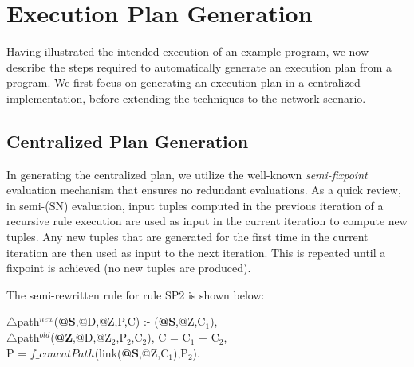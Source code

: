 \section{Execution Plan Generation}
\label{sec:queryPro}

Having illustrated the intended execution of an example program, we
now describe the steps required to automatically generate an execution plan from a
\Dlog program. We first focus on generating
an execution plan in a centralized implementation, before extending
the techniques to the network scenario.

\subsection{Centralized Plan Generation}
\label{sec:semiNaive}

In generating the centralized plan, we utilize the well-known {\em
  semi-\naive fixpoint}~\cite{semi,semi1} evaluation mechanism that
ensures no redundant evaluations. As a quick review, in semi-\naive (SN) evaluation, input
  tuples computed in the previous iteration of a recursive rule
  execution are used as input in the current iteration to compute
  new tuples. Any new tuples that are generated for the first time in the current
  iteration are then used as input to the next iteration. This is repeated until a
  fixpoint is achieved (\ie no new tuples are produced).

The semi-\naive rewritten rule for rule SP2 is shown below:

\vspace{2pt}
{\small
{} $\triangle$path$^{new}$({\bf @S},@D,@Z,P,C) :- \link({{\bf @S},@Z},C$_{1}$),\\
\datalogspace
$\triangle$path$^{old}$({\bf @Z},@D,@Z$_{2}$,P$_{2}$,C$_{2}$), C = C$_{1}$ + C$_{2}$, \\                              
\datalogspace P =
$f\_concatPath$(link({{\bf @S},@Z},C$_{1}$),P$_{2}$).\\ 
}

\vspace{2pt}





